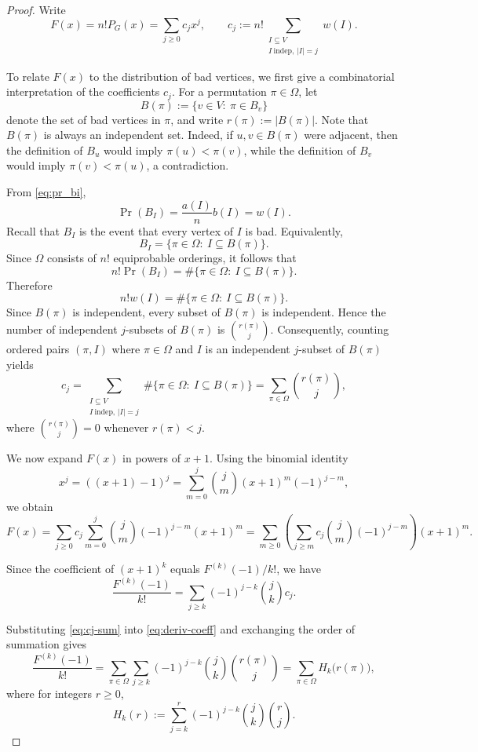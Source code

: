 \documentclass[11pt,a4paper]{article}
\numberwithin{equation}{section}
\theoremstyle{plain}
\theoremstyle{definition}
\theoremstyle{remark}
\begin{document}
\begin{proof}
Write
\[
F(x)=n!P_G(x)=\sum_{j\ge0} c_j x^j,
\qquad
c_j:=n!\sum_{\substack{I\subseteq V\\ I\ \mathrm{indep},\,|I|=j}} w(I).
\]

To relate \(F(x)\) to the distribution of bad vertices, we first give a combinatorial interpretation of the coefficients \(c_j\).
For a permutation \(\pi\in\Omega\), let
\[
B(\pi):=\{v\in V:\ \pi\in B_v\}
\]
denote the set of bad vertices in \(\pi\), and write
\(
r(\pi):=|B(\pi)|.
\)
Note that \(B(\pi)\) is always an independent set. Indeed, if
\(u,v\in B(\pi)\) were adjacent, then the definition of \(B_u\)
would imply \(\pi(u)<\pi(v)\), while the definition of \(B_v\)
would imply \(\pi(v)<\pi(u)\), a contradiction.

From \eqref{eq:pr_bi},
\[
\Pr(B_I)=\frac{a(I)}{n}b(I)=w(I).
\]
Recall that \(B_I\) is the event that every vertex of \(I\) is bad. Equivalently,
\[
B_I=\{\pi\in\Omega:\ I\subseteq B(\pi)\}.
\]
Since \(\Omega\) consists of \(n!\) equiprobable orderings, it follows that
\[
n!\Pr(B_I)
=
\#\{\pi\in\Omega:\ I\subseteq B(\pi)\}.
\]
Therefore
\[
n!w(I)
=
\#\{\pi\in\Omega:\ I\subseteq B(\pi)\}.
\]
Since \(B(\pi)\) is independent, every subset of \(B(\pi)\) is independent. Hence the number of independent \(j\)-subsets of \(B(\pi)\) is \(\binom{r(\pi)}{j}\).
Consequently, counting ordered pairs \((\pi,I)\) where
\(\pi\in\Omega\) and \(I\) is an independent \(j\)-subset of
\(B(\pi)\) yields
\begin{equation}\label{eq:cj-sum}
c_j
=
\sum_{\substack{I\subseteq V\\ I\ \mathrm{indep},\,|I|=j}}
\#\{\pi\in\Omega:\ I\subseteq B(\pi)\}
=
\sum_{\pi\in\Omega}\binom{r(\pi)}{j},
\end{equation}
where \(\binom{r(\pi)}{j}=0\) whenever \(r(\pi)<j\).

We now expand \(F(x)\) in powers of \(x+1\). Using the binomial identity
\[
x^j=((x+1)-1)^j
=
\sum_{m=0}^{j}
\binom{j}{m}
(x+1)^m
(-1)^{j-m},
\]
we obtain
\[
F(x)
=
\sum_{j\ge0}
c_j
\sum_{m=0}^{j}
\binom{j}{m}
(-1)^{j-m}
(x+1)^m
=
\sum_{m\ge0}
\left(
\sum_{j\ge m}
c_j
\binom{j}{m}
(-1)^{j-m}
\right)
(x+1)^m.
\]

Since the coefficient of \((x+1)^k\) equals
\(F^{(k)}(-1)/k!\), we have
\begin{equation}\label{eq:deriv-coeff}
\frac{F^{(k)}(-1)}{k!}
=
\sum_{j\ge k}
(-1)^{j-k}
\binom{j}{k}
c_j.
\end{equation}

Substituting \eqref{eq:cj-sum} into
\eqref{eq:deriv-coeff} and exchanging the order of summation gives
\[
\frac{F^{(k)}(-1)}{k!}
=
\sum_{\pi\in\Omega}
\sum_{j\ge k}
(-1)^{j-k}
\binom{j}{k}
\binom{r(\pi)}{j}
=
\sum_{\pi\in\Omega}
H_k\!\bigl(r(\pi)\bigr),
\]
where for integers \(r\ge0\),
\[
H_k(r)
:=
\sum_{j=k}^{r}
(-1)^{j-k}
\binom{j}{k}
\binom{r}{j}.
\]


\end{proof}
\end{document}
